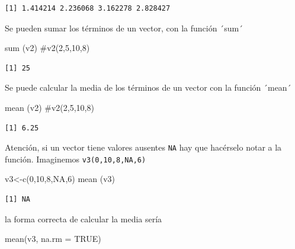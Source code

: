 \documentclass[
  letterpaper,
]{scrbook}
\newenvironment{Shaded}{\begin{snugshade}}{\end{snugshade}}
\newcommand{\AttributeTok}[1]{\textcolor[rgb]{0.40,0.45,0.13}{#1}}
\newcommand{\CommentTok}[1]{\textcolor[rgb]{0.37,0.37,0.37}{#1}}
\newcommand{\ConstantTok}[1]{\textcolor[rgb]{0.56,0.35,0.01}{#1}}
\newcommand{\DecValTok}[1]{\textcolor[rgb]{0.68,0.00,0.00}{#1}}
\newcommand{\FunctionTok}[1]{\textcolor[rgb]{0.28,0.35,0.67}{#1}}
\newcommand{\NormalTok}[1]{\textcolor[rgb]{0.00,0.23,0.31}{#1}}
\newcommand{\OtherTok}[1]{\textcolor[rgb]{0.00,0.23,0.31}{#1}}
\begin{document}
\begin{verbatim}
[1] 1.414214 2.236068 3.162278 2.828427
\end{verbatim}

Se pueden sumar los términos de un vector, con la función ´sum´

\begin{Shaded}
\begin{Highlighting}[]
\FunctionTok{sum}\NormalTok{ (v2) }\CommentTok{\#v2(2,5,10,8) }
\end{Highlighting}
\end{Shaded}

\begin{verbatim}
[1] 25
\end{verbatim}

Se puede calcular la media de los términos de un vector con la función
´mean´

\begin{Shaded}
\begin{Highlighting}[]
\FunctionTok{mean}\NormalTok{ (v2) }\CommentTok{\#v2(2,5,10,8)}
\end{Highlighting}
\end{Shaded}

\begin{verbatim}
[1] 6.25
\end{verbatim}

Atención, si un vector tiene valores ausentes \texttt{NA} hay que
hacérselo notar a la función. Imaginemos \texttt{v3(0,10,8,NA,6)}

\begin{Shaded}
\begin{Highlighting}[]
\NormalTok{v3}\OtherTok{\textless{}{-}}\FunctionTok{c}\NormalTok{(}\DecValTok{0}\NormalTok{,}\DecValTok{10}\NormalTok{,}\DecValTok{8}\NormalTok{,}\ConstantTok{NA}\NormalTok{,}\DecValTok{6}\NormalTok{)}
\FunctionTok{mean}\NormalTok{ (v3)}
\end{Highlighting}
\end{Shaded}

\begin{verbatim}
[1] NA
\end{verbatim}

la forma correcta de calcular la media sería

\begin{Shaded}
\begin{Highlighting}[]
\FunctionTok{mean}\NormalTok{(v3, }\AttributeTok{na.rm =} \ConstantTok{TRUE}\NormalTok{)}
\end{Highlighting}
\end{Shaded}
\end{document}
